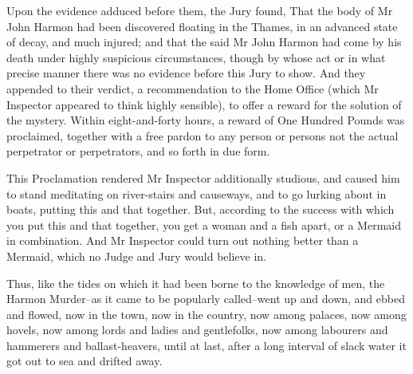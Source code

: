 Upon the evidence adduced before them, the Jury found, That the body
of Mr John Harmon had been discovered floating in the Thames, in an
advanced state of decay, and much injured; and that the said Mr John
Harmon had come by his death under highly suspicious circumstances,
though by whose act or in what precise manner there was no evidence
before this Jury to show. And they appended to their verdict, a
recommendation to the Home Office (which Mr Inspector appeared to think
highly sensible), to offer a reward for the solution of the mystery.
Within eight-and-forty hours, a reward of One Hundred Pounds was
proclaimed, together with a free pardon to any person or persons not the
actual perpetrator or perpetrators, and so forth in due form.

This Proclamation rendered Mr Inspector additionally studious, and
caused him to stand meditating on river-stairs and causeways, and to go
lurking about in boats, putting this and that together. But, according
to the success with which you put this and that together, you get a
woman and a fish apart, or a Mermaid in combination. And Mr Inspector
could turn out nothing better than a Mermaid, which no Judge and Jury
would believe in.

Thus, like the tides on which it had been borne to the knowledge of men,
the Harmon Murder--as it came to be popularly called--went up and down,
and ebbed and flowed, now in the town, now in the country, now among
palaces, now among hovels, now among lords and ladies and gentlefolks,
now among labourers and hammerers and ballast-heavers, until at last,
after a long interval of slack water it got out to sea and drifted away.


